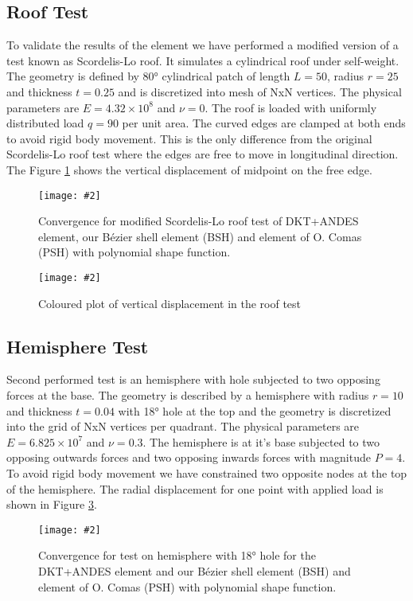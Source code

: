 \documentclass{egpubl}
\newcommand{\Figure}[3]{%
\begin{figure}[htb]
  \centering
  \texttt{[image: \#2]}
  \caption{\label{fig-#2}#3}
\end{figure}}
\begin{document}
\subsection{Roof Test}\label{sec-roof}

To validate the results of the element we have performed a modified version
of a test known as Scordelis-Lo roof. It simulates a cylindrical roof under
self-weight. The geometry is defined by 80° cylindrical patch of length
$L=50$, radius $r=25$ and thickness $t=0.25$ and is discretized into
mesh of NxN vertices. The physical parameters are $E = 4.32 \times 10^8$ and
$\nu = 0$. The roof is loaded with uniformly distributed load $q = 90$ per
unit area. The curved edges are clamped at both ends to avoid rigid body
movement. This is the only difference from the original Scordelis-Lo roof test
where the edges are free to move in longitudinal direction. The Figure
\ref{fig-roof} shows the vertical displacement of midpoint on the free
edge.

\Figure{\linewidth}{roof}
{Convergence for modified Scordelis-Lo roof test of DKT+ANDES element, 
our B\'ezier shell element (BSH) and element of O. Comas (PSH) with polynomial shape function.}

\Figure{\linewidth}{roof-img}
{Coloured plot of vertical displacement in the roof test}


\subsection{Hemisphere Test}\label{sec-hemisphere}

Second performed test is an hemisphere with hole subjected to two opposing
forces at the base. The geometry is described by a hemisphere with radius
$r=10$ and thickness $t=0.04$ with 18° hole at the top and the geometry is
discretized into the grid of NxN vertices per quadrant. The physical
parameters are $E = 6.825 \times 10^7$ and $\nu = 0.3$. The hemisphere is
at it's base subjected to two opposing outwards forces and two opposing
inwards forces with magnitude $P = 4$. To avoid rigid body movement we have
constrained two opposite nodes at the top of the hemisphere. The radial
displacement for one point with applied load is shown in Figure
\ref{fig-hemisphere}.

\Figure{\linewidth}{hemisphere}
{Convergence for test on hemisphere with 18° hole for the DKT+ANDES element and
our B\'ezier shell element (BSH) and element of O. Comas (PSH) with polynomial shape function.}
\end{document}
